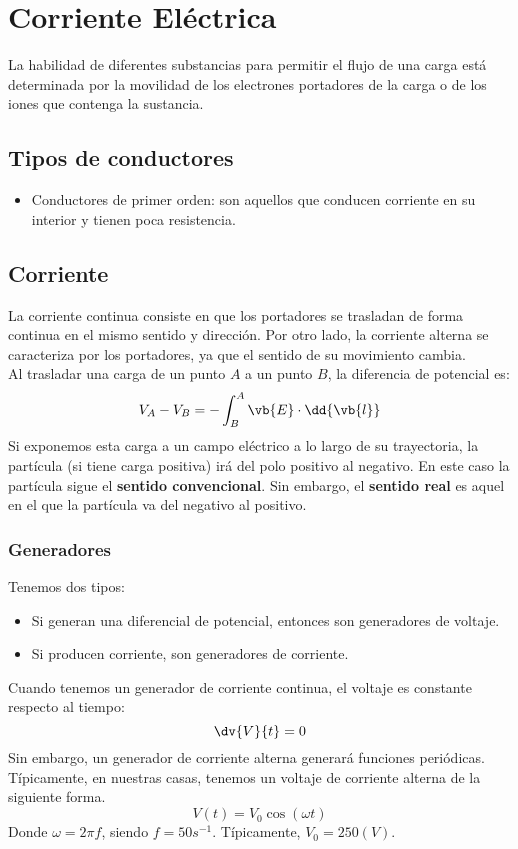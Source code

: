 \documentclass{./FisicaII.tex}
\begin{document}
\chapter{Corriente Eléctrica}
La habilidad de diferentes substancias para permitir el flujo de una carga está determinada por la movilidad de los electrones portadores de la carga o de los iones que contenga la sustancia.
\section{Tipos de conductores}
\begin{itemize}
	\item Conductores de primer orden: son aquellos que conducen corriente en su interior y tienen poca resistencia.
\end{itemize}
\section{Corriente}
La corriente continua consiste en que los portadores se trasladan de forma continua en el mismo sentido y dirección. Por otro lado, la corriente alterna se caracteriza por los portadores, ya que el sentido de su movimiento cambia.\\
Al trasladar una carga de un punto $A$ a un punto $B$, la diferencia de potencial es:
\[
	V_{A}-V_{B} = -\int_{B}^{A} \vb{E} \cdot \dd{\vb{l}}
\]
Si exponemos esta carga a un campo eléctrico a lo largo de su trayectoria, la partícula (si tiene carga positiva) irá del polo positivo al negativo. En este caso la partícula sigue el \textbf{sentido convencional}. Sin embargo, el \textbf{sentido real} es aquel en el que la partícula va del negativo al positivo.
\subsection{Generadores}
Tenemos dos tipos:
\begin{itemize}
	\item Si generan una diferencial de potencial, entonces son generadores de voltaje.
	\item Si producen corriente, son generadores de corriente.
\end{itemize}
Cuando tenemos un generador de corriente continua, el voltaje es constante respecto al tiempo:
\[
	\dv{V}{t}=0
\]
Sin embargo, un generador de corriente alterna generará funciones periódicas.\\
Típicamente, en nuestras casas, tenemos un voltaje de corriente alterna de la siguiente forma.
\[
	V(t)=V_0 \cos(\omega t)
\]
Donde $\omega = 2\pi f$, siendo $f= 50 s^{-1}$. Típicamente, $V_0 = 250(V)$.
\end{document}
